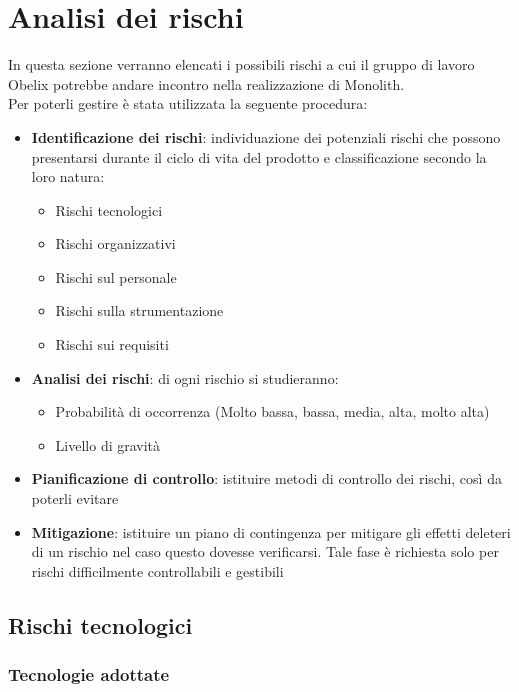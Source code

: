 \section{Analisi dei rischi}
In questa sezione verranno elencati i possibili rischi a cui il gruppo di lavoro Obelix potrebbe andare incontro nella realizzazione di Monolith.\\Per poterli gestire è stata utilizzata la seguente procedura:
\begin{itemize}
\item \textbf{Identificazione dei rischi}: individuazione dei potenziali rischi che possono presentarsi durante il ciclo di vita del prodotto e classificazione secondo la loro natura:
  \begin{itemize}
  \item Rischi tecnologici\item Rischi organizzativi\item Rischi sul personale\item Rischi sulla strumentazione\item Rischi sui requisiti
  \end{itemize}

\item \textbf{Analisi dei rischi}: di ogni rischio si studieranno:
  \begin{itemize}
  \item Probabilità di occorrenza (Molto bassa, bassa, media, alta, molto alta)\item Livello di gravità
  \end{itemize}

\item \textbf{Pianificazione di controllo}: istituire metodi di controllo dei  rischi, così da poterli evitare
\item \textbf{Mitigazione}: istituire un piano di contingenza per
  mitigare gli effetti deleteri di un rischio nel caso questo
  dovesse verificarsi. Tale fase è richiesta solo per rischi
  difficilmente controllabili e gestibili
\end{itemize}

\subsection{Rischi tecnologici}
\subsubsection{Tecnologie adottate}

